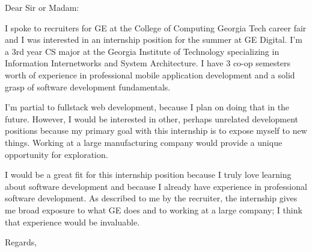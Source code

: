 \documentclass{letter}
\begin{document}
\begin{letter}{}
\opening{Dear Sir or Madam:}

I spoke to recruiters for GE at the College of Computing Georgia Tech career fair and I was interested in an internship position for the summer at GE Digital. I'm a 3rd year CS major at the Georgia Institute of Technology specializing in Information Internetworks and System Architecture. I have 3 co-op semesters worth of experience in professional mobile application development and a solid grasp of software development fundamentals. 

I'm partial to fullstack web development, because I plan on doing that in the future. However, I would be interested in other, perhaps unrelated development positions because my primary goal with this internship is to expose myself to new things. Working at a large manufacturing company would provide a unique opportunity for exploration.

I would be a great fit for this internship position because I truly love learning about software development and because I already have experience in professional software development. As described to me by the recruiter, the internship gives me broad exposure to what GE does and to working at a large company; I think that experience would be invaluable.




\closing{Regards,}
\end{letter}
\end{document}
